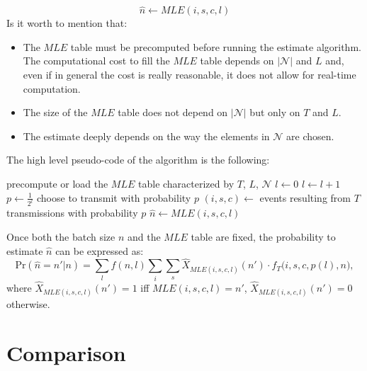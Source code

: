 \documentclass[12pt,a4paper]{report}
\newcommand{\algname}[1]{\ensuremath{\mbox{\sc #1}}}
\begin{document}
\begin{equation}
\hat{n} \longleftarrow MLE(i,s,c,l)
\end{equation}
Is it worth to mention that:
\begin{itemize}
\item  The $MLE$ table must be precomputed before running the estimate algorithm. The computational cost to fill the $MLE$ table depends on $|\mathcal{N}|$ and $L$ and, even if in general the cost is really reasonable, it does not allow for real-time computation.
\item The size of the $MLE$ table does not depend on $|\mathcal{N}|$ but only on $T$ and $L$.
\item The estimate deeply depends on the way the elements in $\mathcal{N}$ are chosen. \\
\end{itemize}

The high level pseudo-code of the algorithm is the following: 
\begin{algorithm}[H]
\begin{algorithmic}
\STATE precompute or load the $MLE$ table characterized by $T$, $L$, $\mathcal{N}$
\STATE $l\gets 0$
\REPEAT
	\STATE $l\gets l+1$
	\STATE $p \gets {\displaystyle\frac{1}{2^{l}}}$
	\STATE choose to transmit with probability $p$
\STATE $(i,s,c) \gets$ events resulting from $T$ transmissions with probability $p$
\STATE $\hat{n}\gets MLE(i,s,c,l)$
\end{algorithmic}
\caption{\algname{Greenberg with MLE $(\mathcal{B},T,\mathcal{N})$}}
\label{alg-greenberg+MLE}
\end{algorithm}

Once both the batch size $n$ and the $MLE$ table are fixed, the probability to estimate $\hat{n}$ can be expressed as:
\begin{equation}
\textrm{Pr}(\hat{n}=n'|n)=\sum_{l}f(n,l)\sum_{i}\sum_{s} \hat{X}_{MLE(i,s,c,l)}(n') \cdot f_{T}\big(i,s,c,p(l),n\bigl),
\end{equation}
 where  $\hat{X}_{MLE(i,s,c,l)}(n')=1$ iff $MLE(i,s,c,l)=n'$,  $\hat{X}_{MLE(i,s,c,l)}(n')=0$ otherwise. 

\chapter{Comparison}
\label{ch:Comparison}
\end{document}
